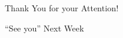 \documentclass[smaller, handout]{beamer}\usepackage[]{graphicx}\usepackage[]{color}
\newcommand{\bea}{\begin{eqnarray}}
\newcommand{\eea}{\end{eqnarray}}
\newcommand{\nn}{\nonumber}
\begin{document}
%
%
%
%
%
%
%
%
%
%
%

\begin{frame}
  \begin{center}
  \Large{Thank You for your Attention!}


  \pause

  \Large{``See you'' Next Week}
  \end{center}
\end{frame}
\end{document}
